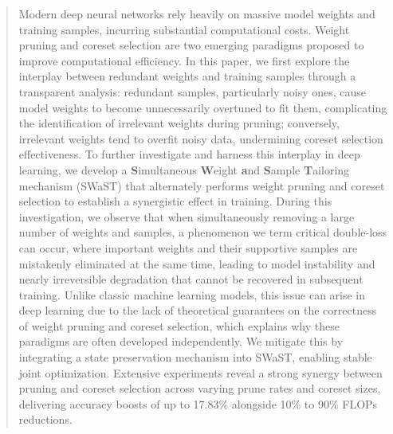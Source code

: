 \begin{abstract}
Modern deep neural networks rely heavily on massive model weights and training samples, incurring substantial computational costs.  
Weight pruning and coreset selection are two emerging paradigms proposed to improve computational efficiency.
In this paper, we first explore the interplay between redundant weights and training samples through a transparent  analysis: redundant samples, particularly noisy ones, cause model weights to become unnecessarily overtuned to fit them, complicating the identification of irrelevant weights during pruning; conversely, irrelevant weights tend to overfit noisy data, undermining coreset selection effectiveness.
To further investigate and harness this interplay in deep learning, we develop a \textbf{S}imultaneous \textbf{W}eight \textbf{a}nd \textbf{S}ample \textbf{T}ailoring mechanism (SWaST) that alternately performs weight pruning and coreset selection to establish a synergistic effect in training.
During this investigation, we observe that when simultaneously removing a large number of weights and samples, a phenomenon we term critical double-loss can occur, where important weights and their supportive samples are mistakenly eliminated at the same time, leading to model instability and nearly irreversible degradation that cannot be recovered in subsequent training. 
Unlike classic machine learning models, this issue can arise in deep learning due to the lack of theoretical guarantees on the correctness of weight pruning and coreset selection, which explains why these paradigms are often developed independently. 
We mitigate this by integrating a state preservation mechanism into SWaST, enabling stable joint optimization.  
Extensive experiments reveal a strong synergy between pruning and coreset selection across varying prune rates and coreset sizes, delivering accuracy boosts of up to 17.83\% alongside 10\% to 90\% FLOPs reductions.
\end{abstract}
